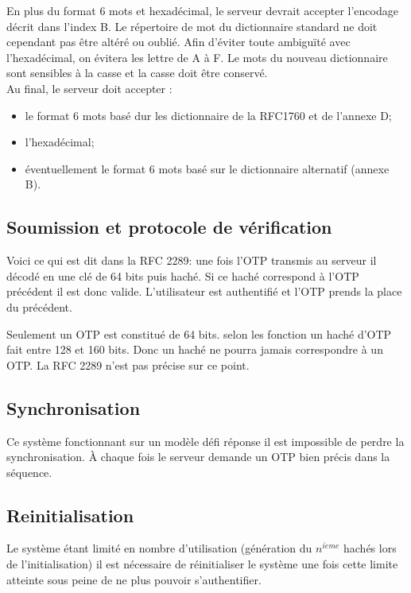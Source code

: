 \documentclass{../res/univ-projet}
\begin{document}
        En plus du format 6 mots et hexadécimal, le serveur devrait accepter 
l'encodage décrit dans l'index B. Le répertoire de mot du dictionnaire standard ne doit 
cependant pas \^etre altéré ou oubli\'e. Afin d'\'eviter toute ambiguïté avec 
l'hexadécimal, on \'evitera les lettre de A à F. Le mots du nouveau dictionnaire sont 
sensibles à la casse et la casse doit être conservé.\\

        Au final, le serveur doit accepter :
        \begin{itemize}
            \item le format 6 mots basé dur les dictionnaire de la RFC1760 et de 
            l'annexe D;
            \item l'hexadécimal;
            \item éventuellement le format 6 mots basé sur le dictionnaire alternatif 
            (annexe B).
        \end{itemize}
  
  \subsection{Soumission et protocole de vérification}
        Voici ce qui est dit dans la RFC 2289:
    une fois l'OTP transmis au serveur il décodé en une clé de 64 bits puis haché.
    Si ce haché correspond à l'OTP précédent il est donc valide.
    L'utilisateur est authentifié et l'OTP prends la place du précédent.
    
        Seulement un OTP est constitué de 64 bits. selon les fonction un haché
    d'OTP fait entre 128 et 160 bits. Donc un haché ne pourra jamais correspondre
    à un OTP. La RFC 2289 n'est pas précise sur ce point.
  
  \subsection{Synchronisation}
    Ce système fonctionnant sur un modèle défi réponse il est impossible de perdre
    la synchronisation. À chaque fois le serveur demande un OTP bien précis dans la séquence.
  
  \subsection{Reinitialisation}
    Le système étant limité en nombre d'utilisation (génération du $n^{i\grave{e}me}$ 
    hachés lors de l'initialisation) il est nécessaire de réinitialiser le système
    une fois cette limite atteinte sous peine de ne plus pouvoir s'authentifier.
    
\end{document}
